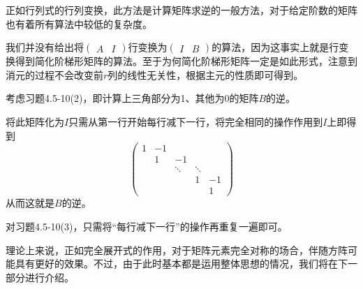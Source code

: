 \documentclass[a4paper,UTF8,fontset=windows]{ctexart}
\newcommand*{\note}{\noindent *}
\begin{document}
正如行列式的行列变换，此方法是计算矩阵求逆的一般方法，对于给定阶数的矩阵也有着所有算法中较低的复杂度。

\note 我们并没有给出将$\begin{pmatrix}A&I\end{pmatrix}$行变换为$\begin{pmatrix}I&B\end{pmatrix}$的算法，因为这事实上就是行变换得到简化阶梯形矩阵的算法。至于为何简化阶梯形矩阵一定是如此形式，注意到消元的过程不会改变前$r$列的线性无关性，根据主元的性质即可得到。

考虑习题4.5-10(2)，即计算上三角部分为1、其他为0的矩阵$B$的逆。

将此矩阵化为$I$只需从第一行开始每行减下一行，将完全相同的操作作用到$I$上即得到
$$\begin{pmatrix}1&-1\\ &1&-1\\ &&\ddots&\ddots\\ &&& 1&-1\\ &&&&1\end{pmatrix}$$
从而这就是$B$的逆。

\note 对习题4.5-10(3)，只需将``每行减下一行''的操作再重复一遍即可。

理论上来说，正如完全展开式的作用，对于矩阵元素完全对称的场合，伴随方阵可能具有更好的效果。不过，由于此时基本都是运用整体思想的情况，我们将在下一部分进行介绍。
\end{document}
